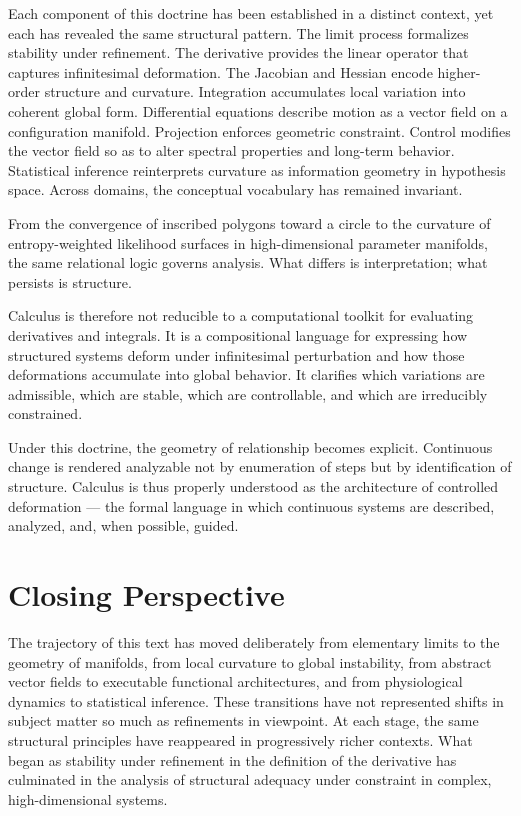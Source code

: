 \documentclass[12pt]{book}
\begin{document}
Each component of this doctrine has been established in a distinct
context, yet each has revealed the same structural pattern. The limit
process formalizes stability under refinement. The derivative provides
the linear operator that captures infinitesimal deformation. The
Jacobian and Hessian encode higher-order structure and curvature.
Integration accumulates local variation into coherent global form.
Differential equations describe motion as a vector field on a
configuration manifold. Projection enforces geometric constraint.
Control modifies the vector field so as to alter spectral properties
and long-term behavior. Statistical inference reinterprets curvature
as information geometry in hypothesis space. Across domains, the
conceptual vocabulary has remained invariant.

From the convergence of inscribed polygons toward a circle to the
curvature of entropy-weighted likelihood surfaces in high-dimensional
parameter manifolds, the same relational logic governs analysis.
What differs is interpretation; what persists is structure.

Calculus is therefore not reducible to a computational toolkit for
evaluating derivatives and integrals. It is a compositional language
for expressing how structured systems deform under infinitesimal
perturbation and how those deformations accumulate into global
behavior. It clarifies which variations are admissible, which are
stable, which are controllable, and which are irreducibly constrained.

Under this doctrine, the geometry of relationship becomes explicit.
Continuous change is rendered analyzable not by enumeration of steps
but by identification of structure. Calculus is thus properly
understood as the architecture of controlled deformation — the formal
language in which continuous systems are described, analyzed, and,
when possible, guided.

\section{Closing Perspective}

The trajectory of this text has moved deliberately from elementary
limits to the geometry of manifolds, from local curvature to global
instability, from abstract vector fields to executable functional
architectures, and from physiological dynamics to statistical
inference. These transitions have not represented shifts in subject
matter so much as refinements in viewpoint. At each stage, the same
structural principles have reappeared in progressively richer
contexts. What began as stability under refinement in the definition
of the derivative has culminated in the analysis of structural
adequacy under constraint in complex, high-dimensional systems.
\end{document}
